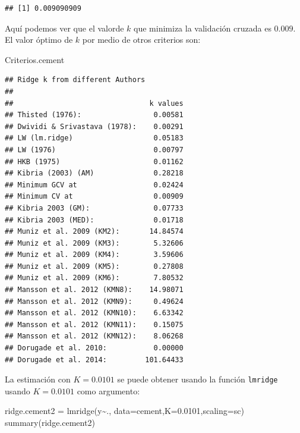 \documentclass[
]{article}
\newenvironment{Shaded}{\begin{snugshade}}{\end{snugshade}}
\newcommand{\AttributeTok}[1]{\textcolor[rgb]{0.77,0.63,0.00}{#1}}
\newcommand{\FloatTok}[1]{\textcolor[rgb]{0.00,0.00,0.81}{#1}}
\newcommand{\FunctionTok}[1]{\textcolor[rgb]{0.00,0.00,0.00}{#1}}
\newcommand{\NormalTok}[1]{#1}
\newcommand{\OtherTok}[1]{\textcolor[rgb]{0.56,0.35,0.01}{#1}}
\newcommand{\SpecialCharTok}[1]{\textcolor[rgb]{0.00,0.00,0.00}{#1}}
\newcommand{\StringTok}[1]{\textcolor[rgb]{0.31,0.60,0.02}{#1}}
\begin{document}
\begin{verbatim}
## [1] 0.009090909
\end{verbatim}

Aquí podemos ver que el valorde \(k\) que minimiza la validación cruzada es \(0.009\). El valor óptimo de \(k\) por medio de otros criterios son:

\begin{Shaded}
\begin{Highlighting}[]
\NormalTok{Criterios.cement}
\end{Highlighting}
\end{Shaded}

\begin{verbatim}
## Ridge k from different Authors
## 
##                                k values
## Thisted (1976):                 0.00581
## Dwividi & Srivastava (1978):    0.00291
## LW (lm.ridge)                   0.05183
## LW (1976)                       0.00797
## HKB (1975)                      0.01162
## Kibria (2003) (AM)              0.28218
## Minimum GCV at                  0.02424
## Minimum CV at                   0.00909
## Kibria 2003 (GM):               0.07733
## Kibria 2003 (MED):              0.01718
## Muniz et al. 2009 (KM2):       14.84574
## Muniz et al. 2009 (KM3):        5.32606
## Muniz et al. 2009 (KM4):        3.59606
## Muniz et al. 2009 (KM5):        0.27808
## Muniz et al. 2009 (KM6):        7.80532
## Mansson et al. 2012 (KMN8):    14.98071
## Mansson et al. 2012 (KMN9):     0.49624
## Mansson et al. 2012 (KMN10):    6.63342
## Mansson et al. 2012 (KMN11):    0.15075
## Mansson et al. 2012 (KMN12):    8.06268
## Dorugade et al. 2010:           0.00000
## Dorugade et al. 2014:         101.64433
\end{verbatim}

La estimación con \(K=0.0101\) se puede obtener usando la función \texttt{lmridge} usando \(K=0.0101\) como argumento:

\begin{Shaded}
\begin{Highlighting}[]
\NormalTok{ridge.cement2 }\OtherTok{=} \FunctionTok{lmridge}\NormalTok{(y}\SpecialCharTok{\textasciitilde{}}\NormalTok{., }\AttributeTok{data=}\NormalTok{cement,}\AttributeTok{K=}\FloatTok{0.0101}\NormalTok{,}\AttributeTok{scaling=}\StringTok{\textquotesingle{}sc\textquotesingle{}}\NormalTok{)}
\FunctionTok{summary}\NormalTok{(ridge.cement2)}
\end{Highlighting}
\end{Shaded}
\end{document}
